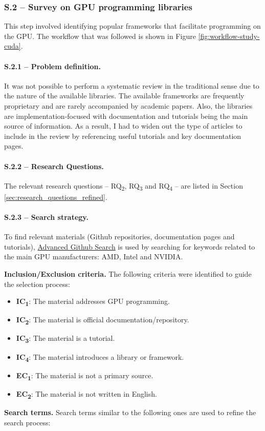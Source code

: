 \subsubsection{S.2 -- Survey on GPU programming libraries}
\label{sec:gpu-programming-libraries}
This step involved identifying popular frameworks that facilitate programming on the GPU. The
workflow that was followed is shown in Figure \ref{fig:workflow-study-cuda}.

\paragraph{S.2.1 -- Problem definition.}
It was not possible to perform a systematic review in the traditional sense due to the nature of
the available libraries. The available frameworks are frequently proprietary and are rarely
accompanied by academic papers. Also, the libraries are implementation-focused with documentation
and tutorials being the main source of information. As a result, I had to widen out the type of
articles to include in the review by referencing useful tutorials and key documentation pages.

\paragraph{S.2.2 -- Research Questions.}
The relevant research questions -- RQ\textsubscript{2}, RQ\textsubscript{3} and RQ\textsubscript{4}
-- are listed in Section \ref{sec:research_questions_refined}.

\paragraph{S.2.3 -- Search strategy.}
To find relevant materials (Github repositories, documentation pages and tutorials),
\href{https://github.com/search/advanced}{Advanced Github Search} is used by searching for keywords
related to the main GPU manufacturers: AMD, Intel and NVIDIA.



\textbf{Inclusion/Exclusion criteria.}
The following criteria were identified to guide the selection process:

\begin{itemize}
	\item \textbf{IC\textsubscript{1}}: The material addresses GPU programming.
	\item \textbf{IC\textsubscript{2}}: The material is official documentation/repository.
	\item \textbf{IC\textsubscript{3}}: The material is a tutorial.
	\item \textbf{IC\textsubscript{4}}: The material introduces a library or framework. \\
	\item \textbf{EC\textsubscript{1}}: The material is not a primary source.
	\item \textbf{EC\textsubscript{2}}: The material is not written in English.
\end{itemize}

\textbf{Search terms.}
Search terms similar to the following ones are used to refine the search process:

